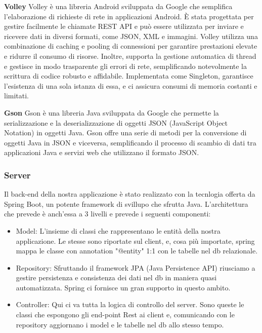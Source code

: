 \begin{flushleft}
        \textbf{Volley} Volley è una libreria Android sviluppata da Google che semplifica l'elaborazione di richieste di rete in applicazioni Android. È stata progettata per gestire facilmente le chiamate REST API e può essere utilizzata per inviare e ricevere dati in diversi formati, come JSON, XML e immagini.
        Volley utilizza una combinazione di caching e pooling di connessioni per garantire prestazioni elevate e ridurre il consumo di risorse. Inoltre, supporta la gestione automatica di thread e gestisce in modo trasparente gli errori di rete, semplificando notevolmente la scrittura di codice robusto e affidabile.
        Implementata come Singleton, garantisce l'esistenza di una sola istanza di essa, e ci assicura consumi di memoria costanti e limitati.
        
        \textbf{Gson} Gson è una libreria Java sviluppata da Google che permette la serializzazione e la deserializzazione di oggetti JSON (JavaScript Object Notation) in oggetti Java. Gson offre una serie di metodi per la conversione di oggetti Java in JSON e viceversa, semplificando il processo di scambio di dati tra applicazioni Java e servizi web che utilizzano il formato JSON. 
    \end{flushleft}
    \vspace{0.2cm}


    \subsubsection{Server}
    \begin{flushleft}
        Il back-end della nostra applicazione è stato realizzato con la tecnlogia offerta da Spring Boot, un potente framework di svillupo che sfrutta Java.
        L'architettura che prevede è anch'essa a 3 livelli e prevede i seguenti componenti:
        \begin{itemize}
            \item Model: L'insieme di classi che rappresentano le entità della nostra applicazione. Le stesse sono riportate sul client, e, cosa più importate, spring mappa le classe con annotation "@entity" 1:1 con le tabelle nel db relazionale.\\
                
            \item Repository: Sfruttando il framework JPA (Java Persistence API) riusciamo a gestire persistenza e consistenza dei dati nel db in maniera quasi automatizzata. Spring ci fornisce un gran supporto in questo ambito.
            \item Controller: Qui ci va tutta la logica di controllo del server. Sono queste le classi che espongono gli end-point Rest ai client e, comunicando con le repository aggiornano i model e le tabelle nel db allo stesso tempo.
        \end{itemize}
    \end{flushleft}

